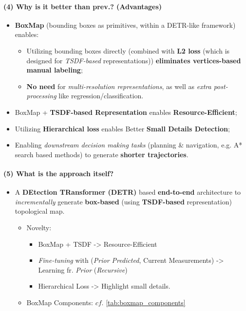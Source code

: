 \documentclass{article}
\begin{document}
\paragraph{(4) Why is it better than prev.? (Advantages)} 
\begin{itemize}
  \item \textbf{BoxMap} (bounding boxes as primitives, within a DETR-like framework) enables:
  \begin{itemize}
    \item Utilizing bounding boxes directly (combined with \textbf{L2 loss} (which is designed for \textit{TSDF-based} representations)) \textbf{eliminates vertices-based manual labeling};
    \item \textbf{No need} for \textit{multi-resolution representations}, as well as \textit{extra post-processing} like regression/classification.
  \end{itemize}
  \item BoxMap + \textbf{TSDF-based Representation} enables \textbf{Resource-Efficient};
  \item Utilizing \textbf{Hierarchical loss} enables Better \textbf{Small Details Detection};
  \item Enabling \textit{downstream decision making tasks} (planning \& navigation, e.g. A* search based methods) to generate \textbf{shorter trajectories}.
\end{itemize}

\paragraph{(5) What is the approach itself?}
\begin{itemize}
  \item A \textbf{DEtection TRansformer (DETR)} based \textbf{end-to-end} architecture to \textit{incrementally} generate \textbf{box-based} (using \textbf{TSDF-based} representation) topological map.
  \begin{itemize}
    \item Novelty:
    \begin{itemize}
      \item BoxMap + TSDF -> Resource-Efficient
      \item \textit{Fine-tuning} with (\textit{Prior Predicted}, Current Measurements) -> Learning fr. \textit{Prior} (\textit{Recursive})
      \item Hierarchical Loss -> Highlight small details.
    \end{itemize}
    \item BoxMap Components: $cf.$ \cref{tab:boxmap_components}
  \end{itemize}
\end{itemize}
\end{document}
